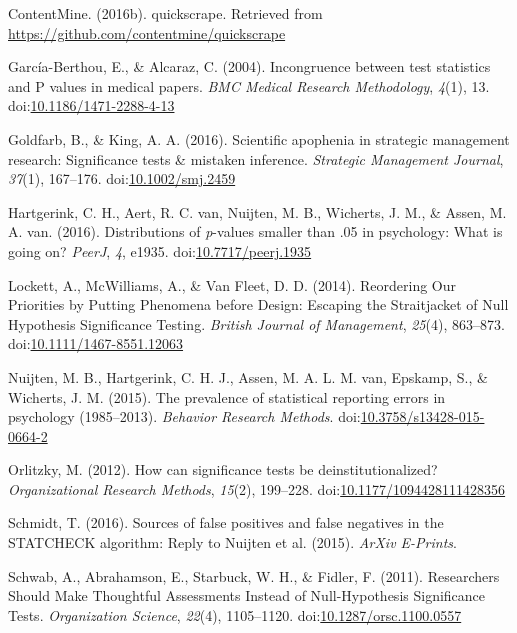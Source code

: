\documentclass[english,floatsintext,man]{apa6}
\begin{document}
\hypertarget{ref-quickscrape}{}
ContentMine. (2016b). quickscrape. Retrieved from
\url{https://github.com/contentmine/quickscrape}

\hypertarget{ref-Garcia-Berthou2004}{}
García-Berthou, E., \& Alcaraz, C. (2004). Incongruence between test
statistics and P values in medical papers. \emph{BMC Medical Research
Methodology}, \emph{4}(1), 13.
doi:\href{https://doi.org/10.1186/1471-2288-4-13}{10.1186/1471-2288-4-13}

\hypertarget{ref-Goldfarb2016}{}
Goldfarb, B., \& King, A. A. (2016). Scientific apophenia in strategic
management research: Significance tests \& mistaken inference.
\emph{Strategic Management Journal}, \emph{37}(1), 167--176.
doi:\href{https://doi.org/10.1002/smj.2459}{10.1002/smj.2459}

\hypertarget{ref-10.7717ux2fpeerj.1935}{}
Hartgerink, C. H., Aert, R. C. van, Nuijten, M. B., Wicherts, J. M., \&
Assen, M. A. van. (2016). Distributions of \emph{p}-values smaller than
.05 in psychology: What is going on? \emph{PeerJ}, \emph{4}, e1935.
doi:\href{https://doi.org/10.7717/peerj.1935}{10.7717/peerj.1935}

\hypertarget{ref-Lockett2014}{}
Lockett, A., McWilliams, A., \& Van Fleet, D. D. (2014). Reordering Our
Priorities by Putting Phenomena before Design: Escaping the Straitjacket
of Null Hypothesis Significance Testing. \emph{British Journal of
Management}, \emph{25}(4), 863--873.
doi:\href{https://doi.org/10.1111/1467-8551.12063}{10.1111/1467-8551.12063}

\hypertarget{ref-Nuijten2015}{}
Nuijten, M. B., Hartgerink, C. H. J., Assen, M. A. L. M. van, Epskamp,
S., \& Wicherts, J. M. (2015). The prevalence of statistical reporting
errors in psychology (1985--2013). \emph{Behavior Research Methods}.
doi:\href{https://doi.org/10.3758/s13428-015-0664-2}{10.3758/s13428-015-0664-2}

\hypertarget{ref-Orlitzky2012}{}
Orlitzky, M. (2012). How can significance tests be deinstitutionalized?
\emph{Organizational Research Methods}, \emph{15}(2), 199--228.
doi:\href{https://doi.org/10.1177/1094428111428356}{10.1177/1094428111428356}

\hypertarget{ref-2016arXiv161001010S}{}
Schmidt, T. (2016). Sources of false positives and false negatives in
the STATCHECK algorithm: Reply to Nuijten et al. (2015). \emph{ArXiv
E-Prints}.

\hypertarget{ref-Schwab2011}{}
Schwab, A., Abrahamson, E., Starbuck, W. H., \& Fidler, F. (2011).
Researchers Should Make Thoughtful Assessments Instead of
Null-Hypothesis Significance Tests. \emph{Organization Science},
\emph{22}(4), 1105--1120.
doi:\href{https://doi.org/10.1287/orsc.1100.0557}{10.1287/orsc.1100.0557}
\end{document}
